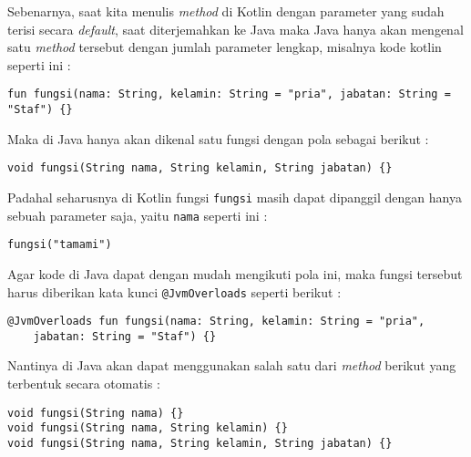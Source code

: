 Sebenarnya, saat kita menulis \textit{method} di Kotlin dengan parameter yang sudah terisi secara \textit{default}, saat diterjemahkan ke Java maka Java hanya akan mengenal satu \textit{method} tersebut dengan jumlah parameter lengkap, misalnya kode kotlin seperti ini :

\begin{lstlisting}
fun fungsi(nama: String, kelamin: String = "pria", jabatan: String = "Staf") {}
\end{lstlisting}

Maka di Java hanya akan dikenal satu fungsi dengan pola sebagai berikut :

\begin{lstlisting}
void fungsi(String nama, String kelamin, String jabatan) {}
\end{lstlisting}

Padahal seharusnya di Kotlin fungsi \texttt{fungsi} masih dapat dipanggil dengan hanya sebuah parameter saja, yaitu \texttt{nama} seperti ini :

\begin{lstlisting}
fungsi("tamami")
\end{lstlisting}

Agar kode di Java dapat dengan mudah mengikuti pola ini, maka fungsi tersebut harus diberikan kata kunci \texttt{@JvmOverloads} seperti berikut :

\begin{lstlisting}
@JvmOverloads fun fungsi(nama: String, kelamin: String = "pria", 
	jabatan: String = "Staf") {}
\end{lstlisting}

Nantinya di Java akan dapat menggunakan salah satu dari \textit{method} berikut yang terbentuk secara otomatis : 

\begin{lstlisting}
void fungsi(String nama) {}
void fungsi(String nama, String kelamin) {}
void fungsi(String nama, String kelamin, String jabatan) {}
\end{lstlisting}